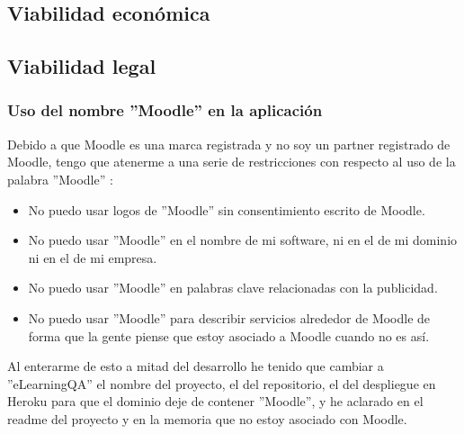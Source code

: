 \subsection{Viabilidad económica}

\subsection{Viabilidad legal}
\subsubsection{Uso del nombre ''Moodle'' en la aplicación}
Debido a que Moodle es una marca registrada y no soy un partner registrado de Moodle, tengo que atenerme a una serie de restricciones con respecto al uso de la palabra ''Moodle'' \cite{moodletrademark-2022}:
\begin{itemize}
	\item No puedo usar logos de ''Moodle'' sin consentimiento escrito de Moodle.
	\item No puedo usar ''Moodle'' en el nombre de mi software, ni en el de mi dominio ni en el de mi empresa.
	\item No puedo usar ''Moodle'' en palabras clave relacionadas con la publicidad.
	\item No puedo usar ''Moodle'' para describir servicios alrededor de Moodle de forma que la gente piense que estoy asociado a Moodle cuando no es así.
\end{itemize}

Al enterarme de esto a mitad del desarrollo he tenido que cambiar a ''eLearningQA'' el nombre del proyecto, el del repositorio, el del despliegue en Heroku para que el dominio deje de contener ''Moodle'', y he aclarado en el readme del proyecto y en la memoria que no estoy asociado con Moodle.
